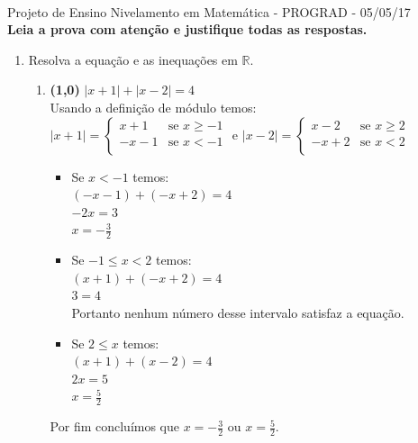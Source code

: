 \documentclass[a4paper,12pt]{article}
\newcommand{\RR}{\mathbb{R}}
\newcommand{\ds}{\displaystyle}
\begin{document}
\vspace{5mm}
\\[3mm]
{\large Projeto de Ensino Nivelamento em Matemática - PROGRAD - 05/05/17}\\[3mm]
{\bf Leia a prova  com atenção e justifique todas as respostas.}

\vspace{5mm}

\begin{enumerate}
\item  Resolva a equação e as inequações em $\RR$.
 \begin{enumerate}
 \item {\bf (1,0)} $\ds |x+1|+|x-2|=4$\\
 Usando a definição de módulo temos:\\
	 
  $ |x+1| =  \left\{
\begin{array}{ll}
      x+1 & \mbox{se }  x \geq -1 \\
      -x -1 & \mbox{se } x < -1 \\
\end{array} 
 \right. $ e $ |x-2| =  \left\{
\begin{array}{ll}
      x - 2 & \mbox{se }  x \geq 2 \\
      -x + 2 & \mbox{se } x < 2 \\
\end{array} 
 \right. $\\
 

 \begin{itemize}
  \item Se $x<-1$ temos:\\
  $(-x-1)+(-x+2)=4$\\
  $-2x=3$\\
  $x= -\frac{3}{2}$\\
  \item Se $-1\leq x < 2$ temos:\\
  $(x+1)+(-x+2)=4$\\
  $3=4$\\
  Portanto nenhum número desse intervalo satisfaz a equação.\\
  \item Se  $2 \leq x$ temos:\\
  $(x+1)+(x-2)=4$\\
  $2x=5$\\
  $x=\frac{5}{2}$\\
  \end{itemize}
  Por fim concluímos que $x=- \frac{3}{2}$ ou $x=\frac{5}{2}$.\\
  

\end{enumerate}
\end{enumerate}
\end{document}
